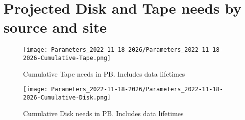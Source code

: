 \section{Projected Disk and Tape needs by source and site}
\begin{figure}[h]
\centering\texttt{[image: Parameters\_2022-11-18-2026/Parameters\_2022-11-18-2026-Cumulative-Tape.png]}\label{fig:Cumulative-Tape}
\caption{Cumulative Tape needs in PB. Includes data lifetimes}
\end{figure}
\begin{figure}[h]
\centering\texttt{[image: Parameters\_2022-11-18-2026/Parameters\_2022-11-18-2026-Cumulative-Disk.png]}\label{fig:Cumulative-Disk}
\caption{Cumulative Disk needs in PB. Includes data lifetimes}
\end{figure}
